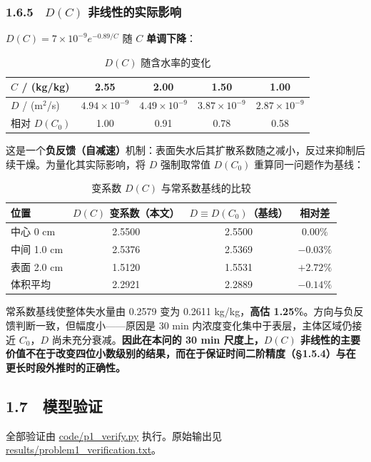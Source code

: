 \documentclass[12pt,a4paper]{ctexart}
\begin{document}
\subsubsection*{1.6.5　$D(C)$ 非线性的实际影响}

$D(C)=7\times10^{-9}e^{-0.89/C}$ 随 $C$ \textbf{单调下降}：

\begin{table}[H]
\centering
\caption{$D(C)$ 随含水率的变化}
\begin{tabular}{lcccc}
\toprule
$C$ / (kg/kg) & 2.55 & 2.00 & 1.50 & 1.00 \\
\midrule
$D$ / (m$^2$/s) & $4.94\times10^{-9}$ & $4.49\times10^{-9}$ & $3.87\times10^{-9}$ & $2.87\times10^{-9}$ \\
相对 $D(C_0)$ & 1.00 & 0.91 & 0.78 & 0.58 \\
\bottomrule
\end{tabular}
\end{table}

这是一个\textbf{负反馈（自减速）}机制：表面失水后其扩散系数随之减小，反过来抑制后续干燥。为量化其实际影响，将 $D$ 强制取常值 $D(C_0)$ 重算同一问题作为基线：

\begin{table}[H]
\centering
\caption{变系数 $D(C)$ 与常系数基线的比较}
\begin{tabular}{lccc}
\toprule
位置 & $D(C)$ 变系数（本文） & $D\equiv D(C_0)$（基线） & 相对差 \\
\midrule
中心 0 cm & 2.5500 & 2.5500 & $0.00\%$ \\
中间 1.0 cm & 2.5376 & 2.5369 & $-0.03\%$ \\
表面 2.0 cm & 1.5120 & 1.5531 & $+2.72\%$ \\
体积平均 & 2.2921 & 2.2889 & $-0.14\%$ \\
\bottomrule
\end{tabular}
\end{table}

常系数基线使整体失水量由 0.2579 变为 0.2611 kg/kg，\textbf{高估 1.25\%}。方向与负反馈判断一致，但幅度小——原因是 30 min 内浓度变化集中于表层，主体区域仍接近 $C_0$，$D$ 尚未充分衰减。\textbf{因此在本问的 30 min 尺度上，$D(C)$ 非线性的主要价值不在于改变四位小数级别的结果，而在于保证时间二阶精度（§1.5.4）与在更长时段外推时的正确性。}

\subsection*{1.7　模型验证}

全部验证由 \url{code/p1_verify.py} 执行。原始输出见 \url{results/problem1_verification.txt}。
\end{document}
